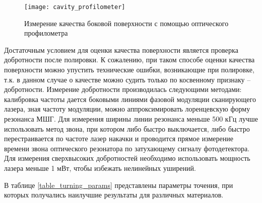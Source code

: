 \begin{figure}[ht]
\centering
  \texttt{[image: cavity\_profilometer]}
  \caption{Измерение качества боковой поверхности с помощью оптического профилометра}
  \label{cavity_profilometer}
\end{figure}

Достаточным условием для оценки качества поверхности является проверка добротности после полировки. К сожалению, при таком способе оценки качества поверхности можно упустить технические ошибки, возникающие при полировке, т.к. в данном случае о качестве можно судить только по косвенному признаку – добротности. Измерение добротности производилась следующими методами: калибровка частоты дается боковыми линиями фазовой модуляции сканирующего лазера, зная частоту модуляции, можно аппроксимировать лоренцевскую форму резонанса МШГ. Для измерения ширины линии резонанса меньше 500 кГц лучше использовать метод звона, при котором либо быстро выключается, либо быстро перестраивается по частоте лазер накачки и проводится прямое измерение времени звона оптического резонатора по затухающему сигналу фотодетектора. Для измерения сверхвысоких добротностей необходимо использовать мощность лазера меньше 1 мВт, чтобы избежать нелинейных уширений.

В таблице \ref{table_turning_params} представлены параметры точения, при которых получались наилучшие результаты для различных материалов. 

